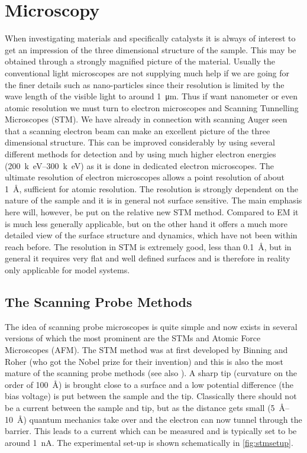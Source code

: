 \chapter{Microscopy}
When investigating materials and specifically catalysts it is always of interest to get an impression of the three dimensional structure of the sample. This may be obtained through a strongly magnified picture of the material. Usually the conventional light microscopes are not supplying much help if we are going for the finer details such as nano-particles since their resolution is limited by the wave length of the visible light to around \SI{1}{\micro m}. Thus if want nanometer or even atomic resolution we must turn to electron microscopes and Scanning Tunnelling Microscopes (STM). We have already in connection with scanning Auger seen that a scanning electron beam can make an excellent picture of the three dimensional structure. This can be improved considerably by using several different methods for detection and by using much higher electron energies (\SIrange{200}{300}{k\electronvolt}) as it is done in dedicated electron microscopes. The ultimate resolution of electron microscopes allows a point resolution of about \SI{1}{\angstrom}, sufficient for atomic resolution. The resolution is  strongly dependent on  the nature of the sample and it is in general not surface sensitive. The main emphasis here will, however, be put on the relative new STM method. Compared to EM it is much less generally applicable, but on the other hand it offers a much more detailed view of the surface structure and dynamics, which have not been within reach before. The resolution in STM is  extremely good, less than \SI{.1}{\angstrom}, but in general it requires very flat and well defined surfaces and is therefore in reality only applicable for model systems.

\section{The Scanning Probe Methods}
The idea of scanning probe microscopes is quite simple and now exists in several versions of which the most prominent are  the STMs and Atomic Force Microscopes (AFM). The STM method was at first developed by Binning and Roher \cite{Roher1, Roher2, Roher3} (who got the Nobel prize for their invention) and this is also the most mature of the scanning probe methods (see also \cite{STM}). A sharp tip (curvature on the order of \SI{100}{\angstrom}) is brought close to a surface and a low potential difference (the bias voltage) is put between the sample and the tip. Classically there should not be a current between the sample and tip, but as the distance gets small (\SIrange{5}{10}{\angstrom}) quantum mechanics take over and the electron can now tunnel through the barrier. This leads to a current which can be measured and is typically set to be around \SI{1}{nA}. The experimental set-up is shown schematically in \autoref{fig:stmsetup}.

